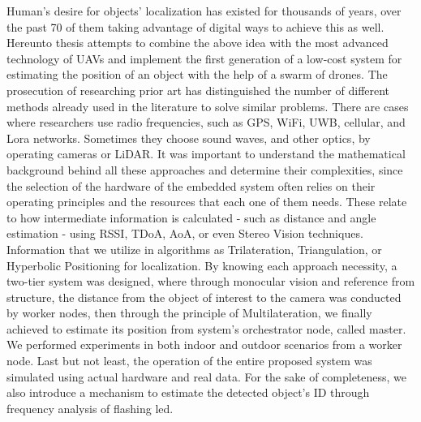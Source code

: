\begin{extraAbstract}
	\addchaptertocentry{\abstractname} %
	
	Human's desire for objects' localization has existed for thousands of years, over the past 70 of them taking advantage of digital ways to achieve this as well.
	Ηereunto thesis attempts to combine the above idea with the most advanced technology of UAVs and implement the first generation of a low-cost system for estimating the position of an object with the help of a swarm of drones.
	The prosecution of researching prior art has distinguished the number of different methods already used in the literature to solve similar problems.
	There are cases where researchers use radio frequencies, such as GPS, WiFi, UWB, cellular, and Lora networks. Sometimes they choose sound waves, and other optics, by operating cameras or LiDAR.
	It was important to understand the mathematical background behind all these approaches and determine their complexities, since the selection of the hardware of the embedded system often relies on their operating principles and the resources that each one of them needs.
	These relate to how intermediate information is calculated - such as distance and angle estimation - using RSSI, TDoA, AoA, or even Stereo Vision techniques. Information that we utilize in algorithms as Trilateration, Triangulation, or Hyperbolic Positioning for localization.
	By knowing each approach necessity, a two-tier system was designed, where through monocular vision and reference from structure, the distance from the object of interest to the camera was conducted by worker nodes, then through the principle of Multilateration, we finally achieved to estimate its position from system’s orchestrator node, called master.
	We performed experiments in both indoor and outdoor scenarios from a worker node. Last but not least, the operation of the entire proposed system was simulated using actual hardware and real data. For the sake of completeness, we also introduce a mechanism to estimate the detected object's ID through frequency analysis of flashing led.
\end{extraAbstract}